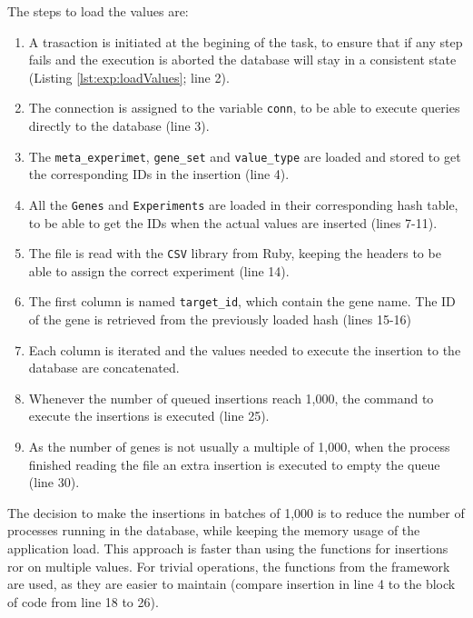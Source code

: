 The steps to load the values are:
\begin{enumerate}
\item A trasaction is initiated at the begining of the task, to ensure that if any step fails and the execution is aborted the database will stay in a consistent state (Listing \ref{lst:exp:loadValues}; line 2).
\item The connection is assigned to the variable \verb|conn|, to be able to execute queries directly to the database (line 3).   
\item The \verb|meta_experimet|, \verb|gene_set| and \verb|value_type| are loaded and stored to get the corresponding IDs in the insertion (line 4).
\item All the \verb|Genes| and \verb|Experiments| are loaded in their corresponding hash table, to be able to get the IDs when the actual values are inserted (lines 7-11). 
\item The file is read with the \verb|CSV| library from Ruby, keeping the headers to be able to assign the correct experiment (line 14). 
\item The first column is named \verb|target_id|, which contain the gene name. The ID of the gene is retrieved from the previously loaded hash (lines 15-16)
\item Each column is iterated and the values needed to execute the insertion to the database are concatenated. 
\item Whenever the number of queued insertions reach 1,000, the command to execute the insertions is executed (line 25). 
\item As the number of genes is not usually a multiple of 1,000, when the process finished reading the file an extra insertion is executed to empty the queue (line 30).
\end{enumerate}

The decision to make the insertions in batches of 1,000 is to reduce the number of processes running in the database, while keeping the memory usage of the application load. 
This approach is faster than using the functions for insertions \acrshort{ror} on multiple values. 
For trivial operations, the functions from the framework are used, as they are easier to maintain (compare insertion in line 4 to the block of code from line 18 to 26). 

